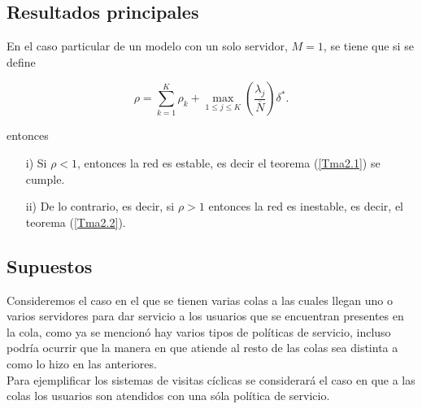 %

\subsection{Resultados principales}
En el caso particular de un modelo con un solo servidor, $M=1$, se
tiene que si se define
\begin{Def}\label{Def.Ro}
\begin{equation}\label{RoM1}
\rho=\sum_{k=1}^{K}\rho_{k}+\max_{1\leq j\leq
K}\left(\frac{\lambda_{j}}{\overline{N}}\right)\delta^{*}.
\end{equation}
\end{Def}
entonces

\begin{Teo}\label{Teo.Down}
\begin{itemize}
\item[i)] Si $\rho<1$, entonces la red es estable, es decir el teorema
(\ref{Tma2.1}) se cumple. \item[ii)] De lo contrario, es decir, si
$\rho>1$ entonces la red es inestable, es decir, el teorema
(\ref{Tma2.2}).
\end{itemize}
\end{Teo}



\subsection{Supuestos}
Consideremos el caso en el que se tienen varias colas a las cuales
llegan uno o varios servidores para dar servicio a los usuarios
que se encuentran presentes en la cola, como ya se mencion\'o hay
varios tipos de pol\'iticas de servicio, incluso podr\'ia ocurrir
que la manera en que atiende al resto de las colas sea distinta a
como lo hizo en las anteriores.\\

Para ejemplificar los sistemas de visitas c\'iclicas se
considerar\'a el caso en que a las colas los usuarios son atendidos con
una s\'ola pol\'itica de servicio.\\


